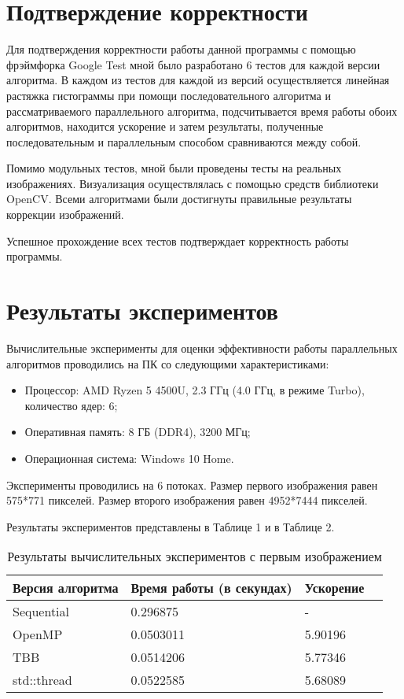 \documentclass{report}
\begin{document}
\section*{Подтверждение корректности}
Для подтверждения корректности работы данной программы с помощью фрэймфорка Google Test мной было разработано 6 тестов для каждой версии алгоритма. В каждом из тестов для каждой из версий осуществляется линейная растяжка гистограммы при помощи последовательного алгоритма и рассматриваемого параллельного алгоритма, подсчитывается время работы обоих алгоритмов, находится ускорение и затем результаты, полученные последовательным и параллельным способом сравниваются между собой.
\par Помимо модульных тестов, мной были проведены тесты на реальных изображениях. Визуализация осуществлялась с помощью средств библиотеки OpenCV. Всеми алгоритмами были достигнуты правильные результаты коррекции изображений.
\par Успешное прохождение всех тестов подтверждает корректность работы программы.
\newpage

\section*{Результаты экспериментов}
Вычислительные эксперименты для оценки эффективности работы параллельных алгоритмов проводились на ПК со следующими характеристиками:
\begin{itemize}
\item Процессор: AMD Ryzen 5 4500U, 2.3 ГГц (4.0 ГГц, в режиме Turbo), количество ядер: 6;
\item Оперативная память: 8 ГБ (DDR4), 3200 МГц;
\item Операционная система: Windows 10 Home.
\end{itemize}

\par Эксперименты проводились на 6 потоках. Размер первого изображения равен 575*771 пикселей. Размер второго изображения равен 4952*7444 пикселей.

\par Результаты экспериментов представлены в Таблице 1 и в Таблице 2.
\begin{table}[!h]
\caption{Результаты вычислительных экспериментов с первым изображением}
\centering
\begin{tabular}{| p{2cm} | p{3cm} | p{4cm} | p{2cm} |}
\hline
Версия алгоритма & Время работы (в секундах) & Ускорение  \\[5pt]
\hline
Sequential        & 0.296875        & -         \\
OpenMP        & 0.0503011        & 5.90196          \\
TBB       & 0.0514206        & 5.77346         \\
std::thread        & 0.0522585        & 5.68089           \\

\hline
\end{tabular}
\end{table}
\end{document}

